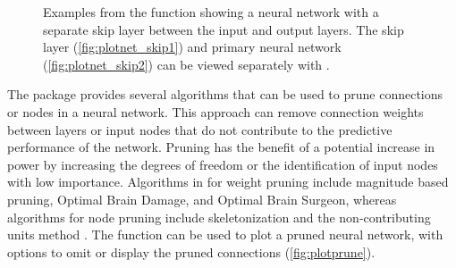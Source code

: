 \documentclass[article,shortnames]{jss}\usepackage[]{graphicx}\usepackage[]{color}
\newenvironment{knitrout}{}{} %
\begin{document}
\begin{knitrout}
\begin{figure}[!ht]
{\centering {}

}

\caption{Examples from the  function showing a neural network with a separate skip layer between the input and output layers.  The skip layer (\ref{fig:plotnet_skip1}) and primary neural network (\ref{fig:plotnet_skip2}) can be viewed separately with .}\label{fig:plotnet_skip}
\end{figure}


\end{knitrout}

The  package provides several algorithms that can be used to prune connections or nodes in a neural network.  This approach can remove connection weights between layers or input nodes that do not contribute to the predictive performance of the network.  Pruning has the benefit of a potential increase in power by increasing the degrees of freedom or the identification of input nodes with low importance.  Algorithms in  for weight pruning include magnitude based pruning, Optimal Brain Damage, and Optimal Brain Surgeon, whereas algorithms for node pruning include skeletonization and the non-contributing units method \citep{Zell98}.  The  function can be used to plot a pruned neural network, with options to omit or display the pruned connections (\cref{fig:plotprune}).  
\end{document}
